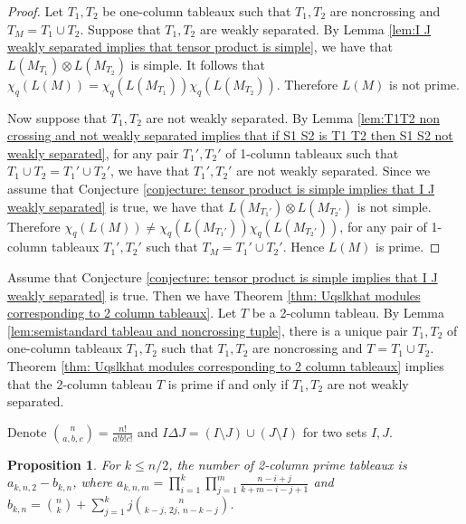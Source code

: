 \documentclass[12pt, reqno]{amsart}
\theoremstyle{plain}
\newtheorem{proposition}[theorem]{Proposition}
\theoremstyle{definition}
\numberwithin{equation}{section}
\begin{document}
\begin{proof}
Let $T_1, T_2$ be one-column tableaux such that $T_1, T_2$ are noncrossing and $T_M = T_1 \cup T_2$. Suppose that $T_1, T_2$ are weakly separated. By Lemma \ref{lem:I J weakly separated implies that tensor product is simple}, we have that $L(M_{T_1}) \otimes L(M_{T_2})$ is simple. It follows that $\chi_q(L(M)) = \chi_q(L(M_{T_1})) \chi_q(L(M_{T_2}))$. Therefore $L(M)$ is not prime.

Now suppose that $T_1, T_2$ are not weakly separated. By Lemma \ref{lem:T1T2 non crossing and not weakly separated implies that if S1 S2 is T1 T2 then S1 S2 not weakly separated}, for any pair $T_1', T_2'$ of 1-column tableaux such that $T_1 \cup T_2 = T_1' \cup T_2'$, we have that $T_1', T_2'$ are not weakly separated. Since we assume that Conjecture \ref{conjecture: tensor product is simple implies that I J weakly separated} is true, we have that $L(M_{T_1'}) \otimes L(M_{T_2'})$ is not simple. Therefore $\chi_q(L(M)) \ne \chi_q(L(M_{T_1'}))\chi_q(L(M_{T_2'}))$, for any pair of 1-column tableaux $T_1', T_2'$ such that $T_M = T_1' \cup T_2'$. Hence $L(M)$ is prime. 
\end{proof}

Assume that Conjecture \ref{conjecture: tensor product is simple implies that I J weakly separated} is true. Then we have Theorem \ref{thm: Uqslkhat modules corresponding to 2 column tableaux}. Let $T$ be a 2-column tableau. By Lemma \ref{lem:semistandard tableau and noncrossing tuple}, there is a unique pair $T_1, T_2$ of one-column tableaux $T_1, T_2$ such that $T_1, T_2$ are noncrossing and $T = T_1 \cup T_2$. Theorem \ref{thm: Uqslkhat modules corresponding to 2 column tableaux} implies that the 2-column tableau $T$ is prime if and only if $T_1, T_2$ are not weakly separated. 

Denote $\genfrac{(}{)}{0pt}{}{n}{a, b, c}=\frac{n!}{a!b!c!}$ and $I \Delta J = (I \setminus J) \cup (J \setminus I)$ for two sets $I, J$. 
\begin{proposition} \label{prop:number of 2-column prime tableaux}
For $k \le n/2$, the number of 2-column prime tableaux is $a_{k,n,2}-b_{k,n}$, where $a_{k,n,m}=\prod_{i=1}^k \prod_{j=1}^m \frac{n-i+j}{k+m-i-j+1}$ and $b_{k,n} = \binom{n}{k} + \sum_{j=1}^{k} j \genfrac{(}{)}{0pt}{}{n}{k-j,\, 2j,\, n-k-j}$.
\end{proposition}
\end{document}
